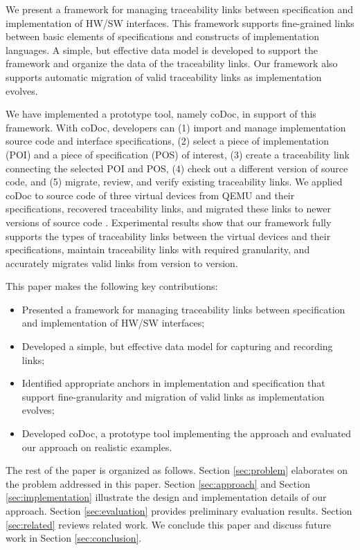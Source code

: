 We present a framework for managing traceability links between specification and implementation of HW/SW interfaces.
This framework supports fine-grained links between basic elements of specifications and constructs of implementation languages.
A simple, but effective data model is developed to support the framework and organize the data of the traceability links.
Our framework also supports automatic migration of valid traceability links as implementation evolves.

We have implemented a prototype tool, namely coDoc, in support of this framework.
With coDoc, developers can (1) import and manage implementation source code and interface specifications, (2) select a piece of implementation (POI) and a piece of specification (POS) of interest, (3) create a traceability link connecting the selected POI and POS, (4) check out a different version of source code, and (5) migrate, review, and verify existing traceability links. We applied coDoc to source code of three virtual devices from QEMU and their specifications, recovered traceability links, and migrated these links to newer versions of source code .
Experimental results show that our framework fully supports the types of traceability links between the virtual devices and their specifications,
maintain traceability links with required granularity, and accurately migrates valid links from version to version.

This paper makes the following key contributions:
\begin{itemize}
\item Presented a framework for managing traceability links between specification and implementation of HW/SW interfaces;  
\item Developed a simple, but effective data model for capturing and recording links; 
\item Identified appropriate anchors in implementation and specification that support fine-granularity and migration of valid links as implementation evolves; 
\item Developed coDoc, a prototype tool implementing the approach and evaluated our approach on realistic examples.
\end{itemize}

The rest of the paper is organized as follows.
Section \ref{sec:problem} elaborates on the problem addressed in this paper.
Section \ref{sec:approach} and Section \ref{sec:implementation} illustrate the design and implementation details of our approach.
Section \ref{sec:evaluation} provides preliminary evaluation results.
Section \ref{sec:related} reviews related work.
We conclude this paper and discuss future work in Section \ref{sec:conclusion}.

